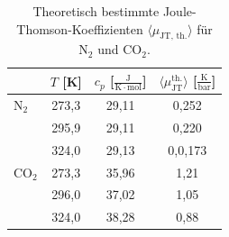 \documentclass[a4paper,12pt,oneside,onecolum,final,openany]{report}
\begin{document}
\begin{table} [h]
\centering
\caption{Theoretisch bestimmte Joule-Thomson-Koeffizienten $\langle \mu_{\text{JT, th.}} \rangle$ für $\text{N}_2$  und $\mathrm{CO}_2$.}
\begin{tabular} {l | c|  c | c}
	 &  $T$ [K] &  $c_p$ [$\frac{\mathrm{J}}{\mathrm{K}\cdot \mathrm{mol}}$] & $ \langle\mu_{\text{JT}}^{\text{th.}}\rangle$ [$\frac{\mathrm{K}}{\mathrm{bar}}$] \\
	 \hline
	  $\text{N}_\mathrm{2}$ & 273,3 & 29,11 & 0,252\\
	   & 295,9 & 29,11 & 0,220\\
	  & 324,0 & 29,13 & 0,0,173 \\
	\hline
	$\mathrm{CO}_2$ & 273,3& 35,96&1,21  \\
	& 296,0 & 37,02& 1,05\\
	& 324,0& 38,28& 0,88\\
\end{tabular}
\end{table}
\FloatBarrier


\end{document}
